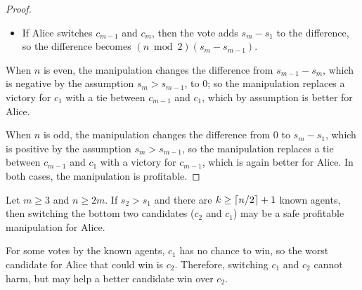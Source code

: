 \begin{proof}
\begin{itemize}
\item If Alice switches $c_{m-1}$ and $c_m$, then 
the vote adds $s_m - s_1$ to the difference, so the difference becomes $(n\bmod 2)(s_m - s_{m-1})$.
\end{itemize}
When $n$ is even, the manipulation changes the difference from $s_{m-1}-s_m$, which is negative by the assumption $s_m > s_{m-1}$, to $0$; so the manipulation replaces a victory for $c_1$ with a tie between $c_{m-1}$ and $c_1$, which by assumption is better for Alice.

When $n$ is odd, the manipulation changes the difference from $0$ to $s_{m}-s_1$, which is positive by the assumption $s_m > s_{m-1}$, so the manipulation replaces a tie between $c_{m-1}$ and $c_1$ with a victory for $c_{m-1}$, which is again better for Alice. In both cases, the manipulation is profitable.
\fi
\end{proof}

\begin{lemmarep}
\label{lem:s2>s1}
Let $m\geq 3$ and $n\geq 2m$.
If $s_2 > s_1$
and there are $k\geq \left\lceil n/2 \right\rceil+1$ known agents,
then
switching the bottom two candidates ($c_2$ and $c_1$) may be a safe profitable manipulation for Alice.
\end{lemmarep}
\begin{proofsketch}
For some votes by the known agents,
$c_1$ has no chance to win, so the worst candidate for Alice that could win is $c_2$. Therefore, switching $c_1$ and $c_2$ cannot harm, but may help a better candidate win over $c_2$.
\end{proofsketch}

